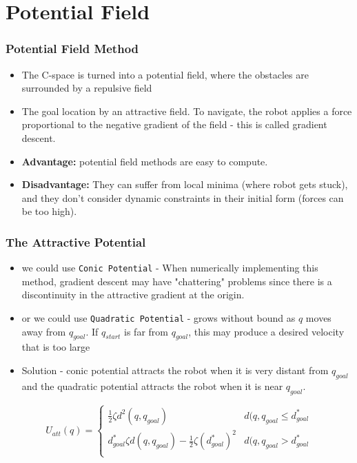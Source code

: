 \documentclass[handout]{beamer}
\begin{document}
  \section[Potential Field]{Potential Field}

  \begin{frame}
    \frametitle{Potential Field Method}
    \begin{itemize}
      \item The C-space is turned into a potential field, where the obstacles are surrounded by a repulsive field
      \item The goal location by an attractive field. To navigate, the robot applies a force proportional to the negative gradient of the field - this is called gradient descent.
      \item \textbf{Advantage:} potential field methods are easy to compute.
      \item \textbf{Disadvantage:} They can suffer from local minima (where robot gets stuck), and they don't consider dynamic constraints in their initial form (forces can be too high).
    \end{itemize}
  \end{frame}

  \begin{frame}
    \frametitle{The Attractive Potential}
    \begin{itemize}
      \item we could use \texttt{Conic Potential} - When numerically implementing this method, gradient descent may have "chattering" problems since there is a discontinuity in the attractive gradient at the origin. 
      \item or we could use \texttt{Quadratic Potential} - grows without bound as $q$ moves away from $q_{goal}$. If $q_{start}$ is far from $q_{goal}$, this may produce a desired velocity that is too large
      \item Solution - conic potential attracts the robot when it is very distant from $q_{goal}$ and the quadratic potential attracts the robot when it is near $q_{goal}$. 
    \end{itemize}

    \centering

    \begin{equation}
      U_{att}(q) =
        \begin{cases}
          \frac{1}{2}\zeta d^{2}(q, q_{goal})  & d(q, q_{goal} \leq d^{*}_{goal}\\
          d^{*}_{goal}\zeta d(q, q_{goal}) - \frac{1}{2}\zeta (d^{*}_{goal})^{2} & d(q, q_{goal} > d^{*}_{goal}\\
        \end{cases}       
    \end{equation}

  \end{frame}
\end{document}
